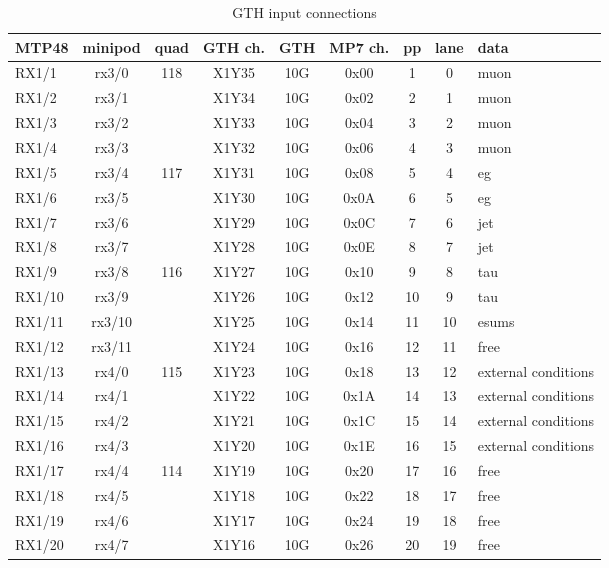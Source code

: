 \begin{longtable}{|l|c|c|c|c|c|c|c|l|}
\caption{GTH input connections}
    \label{tab:app:gth_i_conn}\\
\hline
\textbf{MTP48}& \textbf{minipod}& \textbf{quad}& \textbf{GTH ch.}& \textbf{GTH}& \textbf{MP7 ch.} &\textbf{pp}& \textbf{lane}& \textbf{data}\\
\hline
\hline
\endhead
RX1/1  & rx3/0  & 118 & X1Y35 & 10G & 0x00 & 1  & 0  & muon\\\hline
RX1/2  & rx3/1  &     & X1Y34 & 10G & 0x02 & 2  & 1  & muon\\\hline
RX1/3  & rx3/2  &     & X1Y33 & 10G & 0x04 & 3  & 2  & muon\\\hline
RX1/4  & rx3/3  &     & X1Y32 & 10G & 0x06 & 4  & 3  & muon\\\hline
RX1/5  & rx3/4  & 117 & X1Y31 & 10G & 0x08 & 5  & 4  & eg\\\hline
RX1/6  & rx3/5  &     & X1Y30 & 10G & 0x0A & 6  & 5  & eg\\\hline
RX1/7  & rx3/6  &     & X1Y29 & 10G & 0x0C & 7  & 6  & jet\\\hline
RX1/8  & rx3/7  &     & X1Y28 & 10G & 0x0E & 8  & 7  & jet\\\hline
RX1/9  & rx3/8  & 116 & X1Y27 & 10G & 0x10 & 9  & 8  & tau\\\hline
RX1/10 & rx3/9  &     & X1Y26 & 10G & 0x12 & 10 & 9  & tau\\\hline
RX1/11 & rx3/10 &     & X1Y25 & 10G & 0x14 & 11 & 10 & esums\\\hline
RX1/12 & rx3/11 &     & X1Y24 & 10G & 0x16 & 12 & 11 & free\\\hline
RX1/13 & rx4/0  & 115 & X1Y23 & 10G & 0x18 & 13 & 12 & external conditions\\\hline
RX1/14 & rx4/1  &     & X1Y22 & 10G & 0x1A & 14 & 13 & external conditions\\\hline
RX1/15 & rx4/2  &     & X1Y21 & 10G & 0x1C & 15 & 14 & external conditions\\\hline
RX1/16 & rx4/3  &     & X1Y20 & 10G & 0x1E & 16 & 15 & external conditions\\\hline
RX1/17 & rx4/4  & 114 & X1Y19 & 10G & 0x20 & 17 & 16 & free\\\hline
RX1/18 & rx4/5  &     & X1Y18 & 10G & 0x22 & 18 & 17 & free\\\hline
RX1/19 & rx4/6  &     & X1Y17 & 10G & 0x24 & 19 & 18 & free\\\hline
RX1/20 & rx4/7  &     & X1Y16 & 10G & 0x26 & 20 & 19 & free\\\hline

\end{longtable}

